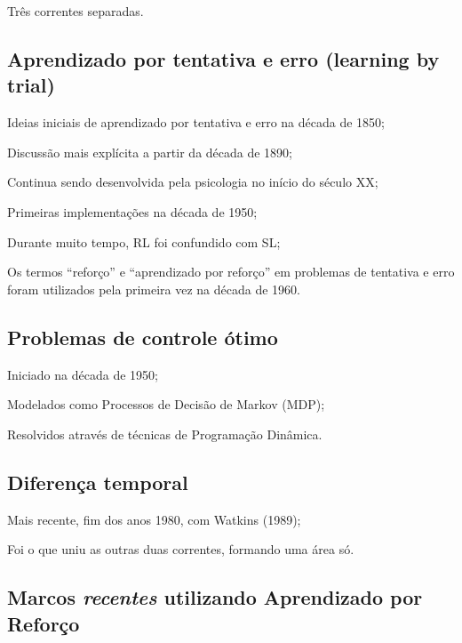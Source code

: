 \documentclass{article}
\begin{document}
        Três correntes separadas.
        
        \subsection{Aprendizado por tentativa e erro (learning by trial)}
            Ideias iniciais de aprendizado por tentativa e erro na década de 1850;
            
            Discussão mais explícita a partir da década de 1890;
            
            Continua sendo desenvolvida pela psicologia no início do século XX;
            
            Primeiras implementações na década de 1950;
            
            Durante muito tempo, RL foi confundido com SL;
            
            Os termos “reforço” e “aprendizado por reforço” em problemas de tentativa e erro foram utilizados pela primeira vez na década de 1960.
    
        
        \subsection{Problemas de controle ótimo}
            Iniciado na década de 1950;
            
            Modelados como Processos de Decisão de Markov (MDP);
            
            Resolvidos através de técnicas de Programação Dinâmica.
    
        
        \subsection{Diferença temporal}
            Mais recente, fim dos anos 1980, com Watkins     (1989);
            
            Foi o que uniu as outras duas correntes, formando uma área só.
            
        \subsection{Marcos \emph{recentes} utilizando Aprendizado por Reforço}
        
\end{document}
